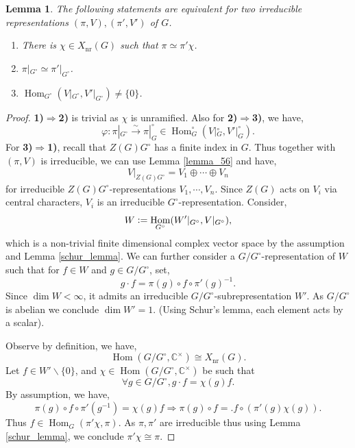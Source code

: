 \documentclass[8pt]{article}
\newtheorem{lemma}{Lemma}[section]
\DeclareMathOperator{\Hom}{Hom}
\DeclareMathOperator{\nr}{nr}
\newcommand{\defeq}{\vcentcolon=}
\newcommand{\Gc}[0]{G^\circ}
\newcommand{\C}[0]{\mathbb{C}}
\begin{document}
\begin{lemma}
  \label{lemma_57}
 The following statements are equivalent for two irreducible representations $(\pi,V),(\pi',V')$ of $G$.
 \begin{enumerate}[1).]
  \item There is $\chi\in X_{\nr}(G)$ such that $\pi\simeq \pi'\chi$.
  \item $\pi|_{G^\circ}\simeq\pi'|_{G^\circ}$.
  \item $\Hom_{G^\circ}(V|_{G^\circ},V'|_{G^\circ})\not=\{0\}$.
 \end{enumerate}
\end{lemma}

\begin{proof}\textbf{1)$\Rightarrow$2)} is trivial as $\chi$ is unramified. Also for \textbf{2)$\Rightarrow$3)}, we have,
  \begin{equation*}
    \varphi:\pi|_{\Gc}\stackrel{\sim}{\to}\pi|_\Gc\in\Hom_\Gc(V|_\Gc,V'|_\Gc).
  \end{equation*}
  For \textbf{3)$\Rightarrow$1)}, recall that $Z(G)G^\circ$ has a finite index in $G$. Thus together with $(\pi,V)$ is irreducible, we can use Lemma \ref{lemma_56} and have,
  \begin{equation*}
    V|_{Z(G)G^\circ}=V_1\oplus\cdots\oplus V_n
  \end{equation*}
  for irreducible $Z(G)G^\circ$-representations $V_1,\cdots,V_n$. Since $Z(G)$ acts on $V_i$ via central characters, $V_i$ is an irreducible $G^\circ$-representation. Consider,
  \begin{equation*}
    W\defeq\Hom_{G^\circ}(W'|_{\Gc},V|_{\Gc}),
  \end{equation*}
  which is a non-trivial finite dimensional complex vector space by the assumption and Lemma \ref{schur_lemma}. We can further consider a $G/\Gc$-representation of $W$ such that for $f\in W$ and $g\in G/\Gc$, set,
  \begin{equation*}
    g\cdot f = \pi(g)\circ f\circ \pi'(g)^{-1}.
  \end{equation*}
  Since $\dim W<\infty$, it admits an irreducible $G/\Gc$-subrepresentation $W'$. As $G/G^\circ$ is abelian we conclude $\dim W'=1$. (Using Schur's lemma, each element acts by a scalar).
  \par Observe by definition, we have,
  \begin{equation*}
    \Hom(G/G^\circ,\C^\times)\cong X_{\nr}(G).
  \end{equation*}
  Let $f\in W'\backslash\{0\}$, and $\chi\in\Hom(G/G^\circ,\C^\times)$ be such that 
  \begin{equation*}
    \forall g\in G/G^\circ, g\cdot f = \chi(g) f.
  \end{equation*}
  By assumption, we have,
  \begin{equation*}
    \pi(g)\circ f\circ\pi'(g^{-1}) = \chi(g)f \Rightarrow \pi(g)\circ f=. f\circ (\pi'(g)\chi(g)).
  \end{equation*}
  Thus $f\in \Hom_G(\pi'\chi,\pi)$. As $\pi,\pi'$ are irreducible thus using Lemma \ref{schur_lemma}, we conclude $\pi'\chi\cong\pi$. 
\end{proof}
\end{document}
